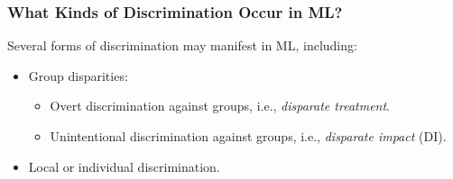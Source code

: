 \documentclass[11pt,aspectratio=169,hyperref={colorlinks}]{beamer}
\begin{document}
		\begin{frame}
		
			\frametitle{What Kinds of Discrimination Occur in ML?}	
			
			\noindent \Large Several forms of discrimination may manifest in ML, including:
			\begin{itemize}
				
				\item Group disparities: 
				
				\begin{itemize}
				
					\item Overt discrimination against groups, i.e., \textit{disparate treatment}.
					
					
					\item Unintentional discrimination against groups, i.e., \textit{disparate impact} (DI).
					
					
				
				\end{itemize}
				
				\item Local or individual discrimination.
				
			\end{itemize}
		
		\end{frame}			
		
\end{document}

